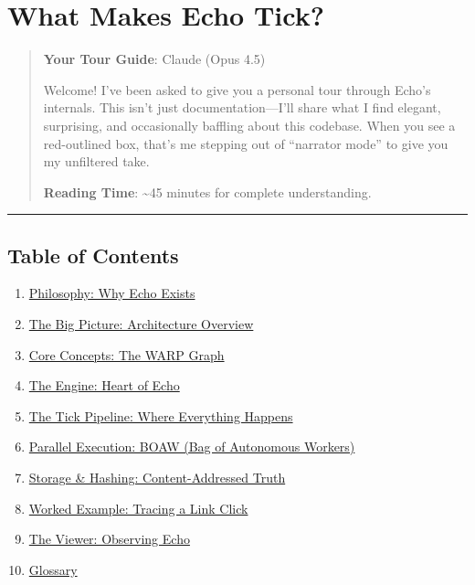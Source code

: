 \documentclass[
  11pt,
]{book}
\author{}
\date{}
\providecommand{\tightlist}{%
  \setlength{\itemsep}{0pt}\setlength{\parskip}{0pt}}
\begin{document}
\frontmatter

\mainmatter
\chapter{What Makes Echo Tick?}\label{what-makes-echo-tick}

\begin{quote}
\textbf{Your Tour Guide}: Claude (Opus 4.5)

Welcome! I've been asked to give you a personal tour through Echo's
internals. This isn't just documentation---I'll share what I find
elegant, surprising, and occasionally baffling about this codebase. When
you see a red-outlined box, that's me stepping out of ``narrator mode''
to give you my unfiltered take.

\textbf{Reading Time}: \textasciitilde45 minutes for complete
understanding.
\end{quote}

\begin{center}\rule{0.5\linewidth}{0.5pt}\end{center}

\section{Table of Contents}\label{table-of-contents}

\begin{enumerate}
\def\labelenumi{\arabic{enumi}.}
\tightlist
\item
  \hyperref[1-philosophy-why-echo-exists]{Philosophy: Why Echo Exists}
\item
  \hyperref[2-the-big-picture-architecture-overview]{The Big Picture:
  Architecture Overview}
\item
  \hyperref[3-core-concepts-the-warp-graph]{Core Concepts: The WARP
  Graph}
\item
  \hyperref[4-the-engine-heart-of-echo]{The Engine: Heart of Echo}
\item
  \hyperref[5-the-tick-pipeline-where-everything-happens]{The Tick
  Pipeline: Where Everything Happens}
\item
  \hyperref[6-parallel-execution-boaw-bag-of-autonomous-workers]{Parallel
  Execution: BOAW (Bag of Autonomous Workers)}
\item
  \hyperref[7-storage--hashing-content-addressed-truth]{Storage \&
  Hashing: Content-Addressed Truth}
\item
  \hyperref[8-worked-example-tracing-a-link-click]{Worked Example:
  Tracing a Link Click}
\item
  \hyperref[9-the-viewer-observing-echo]{The Viewer: Observing Echo}
\item
  \hyperref[10-glossary]{Glossary}
\end{enumerate}
\end{document}
